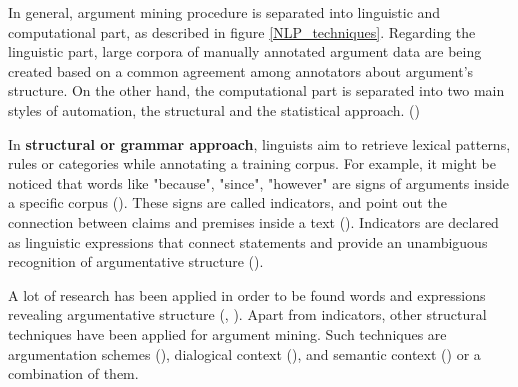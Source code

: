In general, argument mining procedure is separated into linguistic and computational part, as described in figure \ref{NLP_techniques}. Regarding the linguistic part, large corpora of manually annotated argument data are being created based on a common agreement among annotators about argument's structure. On the other hand, the computational part is separated into two main styles of automation, the structural and the statistical approach. (\cite{Budzynska2015}) \par

In \textbf{structural or grammar approach}, linguists aim to retrieve lexical patterns, rules or categories while annotating a training corpus. For example, it might be noticed that words like "because", "since", "however" are signs of arguments inside a specific corpus (\cite{Budzynska2015}). These signs are called indicators, and point out the connection between claims and premises inside a text (\cite{Lawrence2015}). Indicators are declared as linguistic expressions that connect statements and provide an unambiguous recognition of argumentative structure (\cite{Webber2012}). \par

A lot of research has been applied in order to be found words and expressions revealing argumentative structure (\cite{van2007argumentative}, \cite{knott1994using}). Apart from indicators, other structural techniques have been applied for argument mining. Such techniques are argumentation schemes (\cite{Feng2011}), dialogical context (\cite{Budzynska2014}), and semantic context (\cite{Cabrio2012}) or a combination of them. \par

